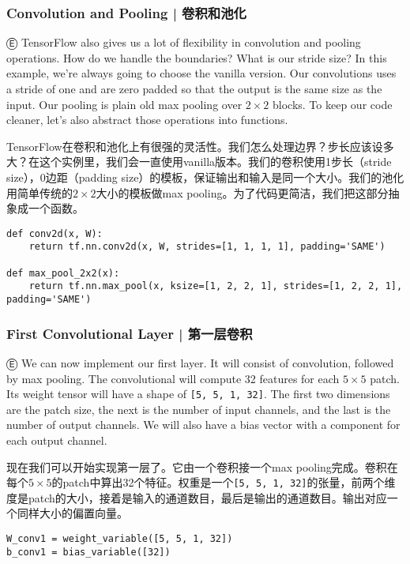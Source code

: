 \subsubsection{Convolution and Pooling  |  卷积和池化}

Ⓔ \textcolor{etc}{TensorFlow also gives us a lot of flexibility in convolution and pooling operations. How do we handle the boundaries? What is our stride size? In this example, we're always going to choose the vanilla version. Our convolutions uses a stride of one and are zero padded so that the output is the same size as the input. Our pooling is plain old max pooling over $2\times2$ blocks. To keep our code cleaner, let's also abstract those operations into functions.}

TensorFlow在卷积和池化上有很强的灵活性。我们怎么处理边界？步长应该设多大？在这个实例里，我们会一直使用vanilla版本。我们的卷积使用1步长（stride size），0边距（padding size）的模板，保证输出和输入是同一个大小。我们的池化用简单传统的$2\times2$大小的模板做max pooling。为了代码更简洁，我们把这部分抽象成一个函数。

\begin{lstlisting}
def conv2d(x, W):
    return tf.nn.conv2d(x, W, strides=[1, 1, 1, 1], padding='SAME')

def max_pool_2x2(x):
    return tf.nn.max_pool(x, ksize=[1, 2, 2, 1], strides=[1, 2, 2, 1], padding='SAME')
\end{lstlisting}

\subsubsection{First Convolutional Layer  |  第一层卷积}

Ⓔ \textcolor{etc}{We can now implement our first layer. It will consist of convolution, followed by max pooling. The convolutional will compute 32 features for each $5\times5$ patch. Its weight tensor will have a shape of \lstinline{[5, 5, 1, 32]}. The first two dimensions are the patch size, the next is the number of input channels, and the last is the number of output channels. We will also have a bias vector with a component for each output channel.}

现在我们可以开始实现第一层了。它由一个卷积接一个max pooling完成。卷积在每个$5\times5$的patch中算出32个特征。权重是一个\lstinline{[5, 5, 1, 32]}的张量，前两个维度是patch的大小，接着是输入的通道数目，最后是输出的通道数目。输出对应一个同样大小的偏置向量。

\begin{lstlisting}
W_conv1 = weight_variable([5, 5, 1, 32])
b_conv1 = bias_variable([32])
\end{lstlisting}

